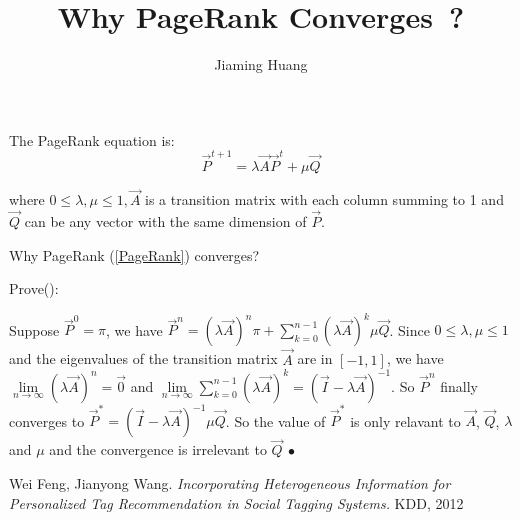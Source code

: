 \documentclass[a4paper, 11pt]{article}
\author{Jiaming Huang}
\title{Why PageRank Converges~?}
\begin{document}
	\maketitle
	The PageRank equation is: 
	\begin{equation}\label{PageRank}
	\vec{P}^{t+1}=\lambda \vec{A}\vec{P}^t+\mu \vec{Q}
	\end{equation}
	
	where $0\leq \lambda, \mu \leq 1, \vec{A} $ is a transition matrix with each column summing to 1 and $\vec{Q}$ can be any vector with the same dimension of $\vec{P}$. 
	
	Why PageRank (\ref{PageRank}) converges? 
	
	Prove(\cite{PageRank Prove}):
	
	Suppose $\vec{P}^0=\pi$, we have $\vec{P}^n=(\lambda \vec{A})^n\pi + \sum_{k=0}^{n-1}(\lambda \vec{A})^k \mu \vec{Q} $. Since $ 0 \leq \lambda, \mu \leq 1 $ and the eigenvalues of the transition matrix $\vec{A}$ are in $[-1, 1]$, we have $\lim\limits_{n\to \infty }(\lambda \vec{A})^n=\vec{0}$ and $\lim\limits_{n\to \infty}\sum_{k=0}^{n-1}(\lambda \vec{A})^k =(\vec{I}-\lambda \vec{A})^{-1}$. So $\vec{P}^n$ finally converges to $\vec{P}^*=(\vec{I}-\lambda \vec{A})^{-1}\mu \vec{Q}$. So the value of $\vec{P}^*$ is only relavant to $\vec{A}$, $\vec{Q}$, $\lambda$ and $\mu$ and the convergence is irrelevant to $\vec{Q} ~\bullet$
	
	\medskip
	\begin{thebibliography}{9}
	Wei Feng, Jianyong Wang.
	\textit{Incorporating Heterogeneous Information for Personalized Tag Recommendation in Social Tagging Systems.} KDD, 2012
	\end{thebibliography}
\end{document}
